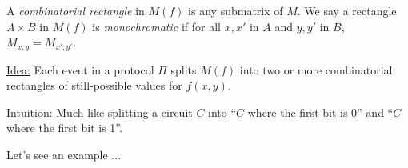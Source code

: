 \begin{definition}
A \emph{combinatorial rectangle} in $M(f)$ is any submatrix of $M$.
We say a rectangle $A \times B$ in $M(f)$ is \emph{monochromatic}
if for all $x, x'$ in $A$ and $y, y'$ in $B$, $M_{x,y} = M_{x',y'}$.
\end{definition}
\pause
\medskip

\underline{Idea:} Each event in a protocol $\Pi$ splits $M(f)$ into two or more
combinatorial rectangles of still-possible values for $f(x, y)$.
\pause
\medskip

\underline{Intuition:} Much like splitting a circuit $C$ into ``$C$ where the first bit is 0'' and ``$C$ where the first bit is 1''.
\pause
\medskip

Let's see an example ...